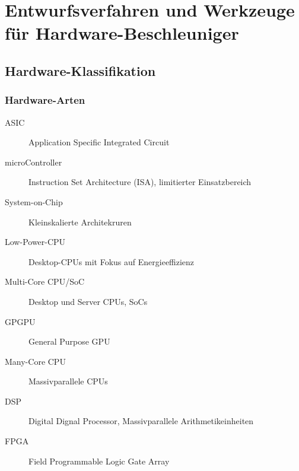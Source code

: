 \chapter{Entwurfsverfahren und Werkzeuge für Hardware-Beschleuniger}
	\section{Hardware-Klassifikation}
		\subsection{Hardware-Arten}
			\begin{description}
				\item[ASIC] Application Specific Integrated Circuit
				\item[microController] Instruction Set Architecture (ISA), limitierter Einsatzbereich
				\item[System-on-Chip] Kleinskalierte Architekruren
				\item[Low-Power-CPU] Desktop-CPUs mit Fokus auf Energieeffizienz
				\item[Multi-Core CPU/SoC] Desktop und Server CPUs, SoCs
				\item[GPGPU] General Purpose GPU
				\item[Many-Core CPU] Massivparallele CPUs
				\item[DSP] Digital Dignal Processor, Massivparallele Arithmetikeinheiten
				\item[FPGA] Field Programmable Logic Gate Array
			\end{description}

